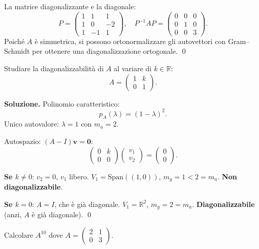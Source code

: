 La matrice diagonalizzante e la diagonale:
\[ P = \begin{pmatrix} 1 & 1 & 1 \\ 1 & 0 & -2 \\ 1 & -1 & 1 \end{pmatrix}, \quad P^{-1}AP = \begin{pmatrix} 0 & 0 & 0 \\ 0 & 1 & 0 \\ 0 & 0 & 3 \end{pmatrix}. \]
Poiché $A$ è simmetrica, si possono ortonormalizzare gli autovettori con Gram--Schmidt per ottenere una diagonalizzazione ortogonale. \qed

\medskip

\begin{examplebox}
Studiare la diagonalizzabilità di $A$ al variare di $k \in \mathbb{R}$:
\[ A = \begin{pmatrix} 1 & k \\ 0 & 1 \end{pmatrix}. \]
\end{examplebox}

\textbf{Soluzione.} Polinomio caratteristico:
\[ p_A(\lambda) = (1 - \lambda)^2. \]
Unico autovalore: $\lambda = 1$ con $m_a = 2$.

Autospazio: $(A - I)\mathbf{v} = \mathbf{0}$:
\[ \begin{pmatrix} 0 & k \\ 0 & 0 \end{pmatrix}\begin{pmatrix} v_1 \\ v_2 \end{pmatrix} = \begin{pmatrix} 0 \\ 0 \end{pmatrix}. \]

\textbf{Se $k \neq 0$}: $v_2 = 0$, $v_1$ libero. $V_1 = \text{Span}((1,0))$, $m_g = 1 < 2 = m_a$. \textbf{Non diagonalizzabile}.

\textbf{Se $k = 0$}: $A = I$, che è già diagonale. $V_1 = \mathbb{R}^2$, $m_g = 2 = m_a$. \textbf{Diagonalizzabile} (anzi, $A$ è già diagonale). \qed

\medskip

\begin{examplebox}
Calcolare $A^{10}$ dove $A = \begin{pmatrix} 2 & 1 \\ 0 & 3 \end{pmatrix}$.
\end{examplebox}

